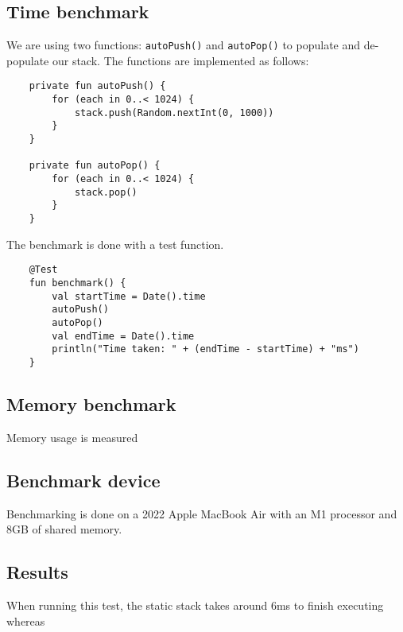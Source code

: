 \documentclass{article}
\begin{document}
\subsection{Time benchmark}

We are using two functions: \texttt{autoPush()} and \texttt{autoPop()} to populate and de-populate our stack. The functions are implemented as follows:

\begin{verbatim}
    private fun autoPush() {
        for (each in 0..< 1024) {
            stack.push(Random.nextInt(0, 1000))
        }
    }

    private fun autoPop() {
        for (each in 0..< 1024) {
            stack.pop()
        }
    }
\end{verbatim}

The benchmark is done with a test function.

\begin{verbatim}
    @Test 
    fun benchmark() {
        val startTime = Date().time
        autoPush()
        autoPop()
        val endTime = Date().time
        println("Time taken: " + (endTime - startTime) + "ms")
    }
\end{verbatim}

\subsection{Memory benchmark}
Memory usage is measured

\subsection{Benchmark device}
Benchmarking is done on a 2022 Apple MacBook Air with an M1 processor and 8GB of shared memory.

\subsection{Results}

When running this test, the static stack takes around 6ms to finish executing whereas







\begin{verbatim}

\end{verbatim}
\end{document}
